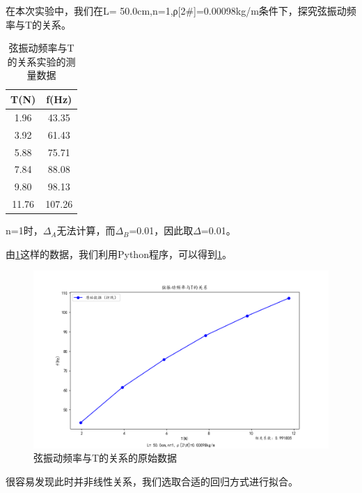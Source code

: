 在本次实验中，我们在L= 50.0cm,n=1,ρ[2\#]=0.00098kg/m条件下，探究弦振动频率与T的关系。
\begin{table}[h]
    \centering
    \begin{tabular}{|c|c|}
        \hline
        T(N)  & f(Hz)  \\
        \hline
        1.96  & 43.35  \\
        3.92  & 61.43  \\
        5.88  & 75.71  \\
        7.84  & 88.08  \\
        9.80  & 98.13  \\
        11.76 & 107.26 \\
        \hline
    \end{tabular}
    \caption{弦振动频率与T的关系实验的测量数据}
    \label{6283f961}
\end{table}

n=1时，$\Delta_A$无法计算，而$\Delta_B$=0.01，因此取$\Delta$=0.01。

由\ref{6283f961}这样的数据，我们利用Python程序，可以得到\ref{e75eff9d}。
\begin{figure}[h]
    \centering
    \includegraphics[scale=0.5]{2_original.png}
    \caption{弦振动频率与T的关系的原始数据}
    \label{e75eff9d}
\end{figure}

很容易发现此时并非线性关系，我们选取合适的回归方式进行拟合。

